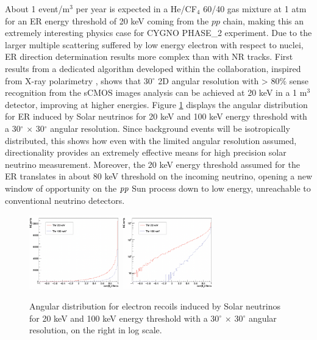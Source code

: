 \documentclass[physics,article,submit,moreauthors,pdftex]{Definitions/mdpi}
\begin{document}
About 1 event/m$^3$ per year is expected in a He/CF$_4$ 60/40 gas mixture at 1 atm for an ER energy threshold of 20 keV coming from the $pp$ chain, making this an extremely interesting physics case for CYGNO PHASE\_2 experiment. Due to the larger multiple scattering suffered by low energy electron with respect to nuclei, ER direction determination results more complex than with NR tracks. First results from a dedicated algorithm developed within the collaboration, inspired from X-ray polarimetry \cite{Soffitta:2012hx}, shows that 30$^{\circ}$ 2D angular resolution with > 80$\%$ sense recognition from the sCMOS images analysis can be achieved at 20 keV in a 1 m$^3$ detector, improving at higher energies. Figure \ref{fig:neutrino} displays the angular distribution for ER induced by Solar neutrinos for 20 keV and 100 keV energy threshold with a 30$^{\circ}$ $\times$ 30$^{\circ}$ angular resolution. Since background events will be isotropically distributed, this shows how even with the limited angular resolution assumed, directionality provides an extremely effective means for high precision solar neutrino measurement. Moreover, the 20 keV energy threshold assumed for the ER translates in about 80 keV threshold on the incoming neutrino,
opening a new window of opportunity on the $\emph{pp}$ Sun process down to low energy, unreachable to conventional neutrino detectors\cite{Seguinot:1992zu}.


\begin{figure}[t!]
\centering
 \includegraphics[width=0.35\textwidth]{solar_neutrino_spectrum_20_100_keV.png}
 \includegraphics[width=0.35\textwidth]{solar_neutrino_spectrum_20_100_keV_log.png}
 \caption{Angular distribution for electron recoils induced by Solar neutrinos for 20 keV and 100 keV energy threshold with a 30$^{\circ}$ $\times$ 30$^{\circ}$ angular resolution, on the right in log scale.}
 \label{fig:neutrino}
 \end{figure}
\end{document}
